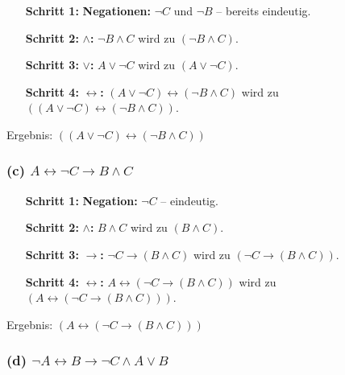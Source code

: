 \documentclass[a4paper,12pt]{article}
\begin{document}
\begin{enumerate}[leftmargin=2cm]
\item[\textbf{Schritt 1:}] \textbf{Negationen:} $\neg C$ und $\neg B$ --
bereits eindeutig.

\item[\textbf{Schritt 2:}] \textbf{$\wedge$:}
$\neg B \wedge C$ wird zu $(\neg B \wedge C)$.

\item[\textbf{Schritt 3:}] \textbf{$\vee$:}
$A \vee \neg C$ wird zu $(A \vee \neg C)$.

\item[\textbf{Schritt 4:}] \textbf{$\leftrightarrow$:}
$(A \vee \neg C) \leftrightarrow (\neg B \wedge C)$ wird zu
$((A \vee \neg C) \leftrightarrow (\neg B \wedge C))$.
\end{enumerate}

\begin{merkbox}
Ergebnis: $\boxed{((A \vee \neg C) \leftrightarrow (\neg B \wedge C))}$
\end{merkbox}

\subsubsection*{(c) $A \leftrightarrow \neg C \to B \wedge C$}

\begin{enumerate}[leftmargin=2cm]
\item[\textbf{Schritt 1:}] \textbf{Negation:} $\neg C$ -- eindeutig.

\item[\textbf{Schritt 2:}] \textbf{$\wedge$:}
$B \wedge C$ wird zu $(B \wedge C)$.

\item[\textbf{Schritt 3:}] \textbf{$\to$:}
$\neg C \to (B \wedge C)$ wird zu $(\neg C \to (B \wedge C))$.

\item[\textbf{Schritt 4:}] \textbf{$\leftrightarrow$:}
$A \leftrightarrow (\neg C \to (B \wedge C))$ wird zu
$(A \leftrightarrow (\neg C \to (B \wedge C)))$.
\end{enumerate}

\begin{merkbox}
Ergebnis: $\boxed{(A \leftrightarrow (\neg C \to (B \wedge C)))}$
\end{merkbox}

\subsubsection*{(d) $\neg A \leftrightarrow B \to \neg C \wedge A \vee B$}
\end{document}
